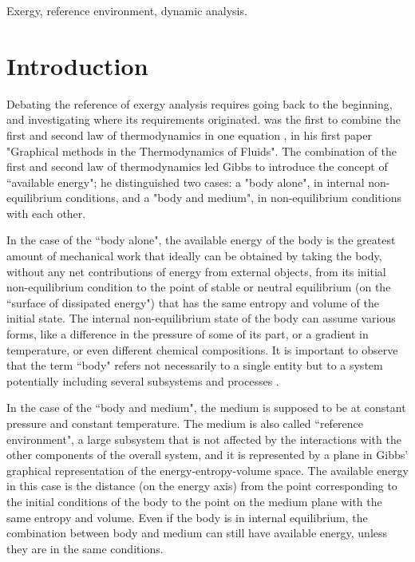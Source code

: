 \documentclass[10pt]{extarticle} %
\begin{document}
{\sffamily\normalsize Exergy, reference environment, dynamic analysis.}


\section{Introduction} 

\sffamily\normalsize


Debating the reference of exergy analysis requires going back to the beginning, and investigating where its requirements originated. 
\cite{Gibbs1873} was the first to combine the first and second law of thermodynamics in one equation \citep{Klein1990}, in his first paper "Graphical methods in the Thermodynamics of Fluids".  The combination of the first and second law of thermodynamics led Gibbs to introduce the concept of ``available energy"; he distinguished two cases: a "body alone", in internal non-equilibrium conditions, and a "body and medium", in non-equilibrium conditions with each other. 

In the case of the ``body alone", the available energy of the body is the greatest amount of mechanical work that ideally can be obtained by taking the body, without any net contributions of energy from external objects, from its initial non-equilibrium condition to the point of stable or neutral equilibrium (on the ``surface of dissipated energy") that has the same entropy and volume of the initial state. The internal non-equilibrium state of the body can assume various forms, like a difference in the pressure of some of its part, or a gradient in temperature, or even different chemical compositions. It is important to observe that the term ``body" refers not necessarily to a single entity but to a system potentially including several subsystems and processes \citep{Gaggioli2012}.
 
In the case of the ``body and medium", the medium is supposed to be at constant pressure and constant temperature. The medium is also called ``reference environment", a large subsystem that is not affected by the interactions with the other components of the overall system, and it is represented by a plane in Gibbs' graphical representation of the energy-entropy-volume space. The available energy in this case is the distance (on the energy axis) from the point corresponding to the initial conditions of the body to the point on the medium plane with the same entropy and volume. Even if the body is in internal equilibrium, the combination between body and medium can still have available energy, unless they are in the same conditions. 
\end{document}
